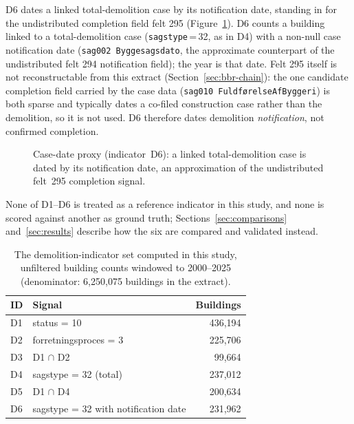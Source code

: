 D6 dates a linked total-demolition case by its notification date,
standing in for the undistributed completion field felt 295
(Figure~\ref{fig:ind-d6}). D6 counts a building linked to a
total-demolition case (\texttt{sagstype}\,=\,32, as in D4) with a non-null
case notification date (\texttt{sag002 Byggesagsdato}, the approximate
counterpart of the undistributed felt 294 notification field); the year
is that date. Felt 295 itself is not reconstructable from this extract
(Section~\ref{sec:bbr-chain}): the one candidate completion field carried
by the case data (\texttt{sag010 FuldførelseAfByggeri}) is both sparse
and typically dates a co-filed construction case rather than the
demolition, so it is not used. D6 therefore dates demolition
\emph{notification}, not confirmed completion.

\begin{figure}[h!]
\centering
{}
\caption{Case-date proxy (indicator~D6): a linked total-demolition case
is dated by its notification date, an approximation of the undistributed
felt~295 completion signal.}
\label{fig:ind-d6}
\end{figure}

None of D1--D6 is treated as a reference indicator in this study, and
none is scored against another as ground truth; Sections~\ref{sec:comparisons}
and~\ref{sec:results} describe how the six are compared and validated
instead.

\begin{table}[htbp]
\centering
\small
\caption{The demolition-indicator set computed in this study, unfiltered
building counts windowed to 2000--2025 (denominator: 6{,}250{,}075
buildings in the extract).}
\label{tab:d-indicators}
\begin{tabular}{@{}lp{7.4cm}r@{}}
\toprule
ID & Signal & Buildings \\
\midrule
D1 & status = 10 & 436{,}194 \\
D2 & forretningsproces = 3 & 225{,}706 \\
D3 & D1 $\cap$ D2 & 99{,}664 \\
D4 & sagstype = 32 (total) & 237{,}012 \\
D5 & D1 $\cap$ D4 & 200{,}634 \\
D6 & sagstype = 32 with notification date & 231{,}962 \\
\bottomrule
\end{tabular}
\end{table}

